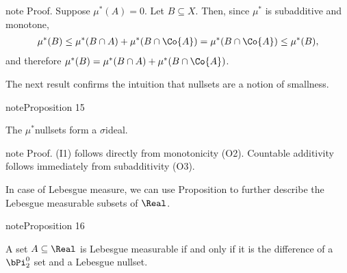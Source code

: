 \documentclass[letterpaper,10pt,english]{jupyterBook}
\begin{document}
\begin{sphinxadmonition}{note}
\sphinxAtStartPar
Proof. Suppose \(\mu^*(A)=0\). Let \(B \subseteq X\). Then, since \(\mu^*\) is subadditive and monotone,
\begin{equation*}
\begin{split}
    \mu^*(B) \leq \mu^*(B \cap A) + \mu^*(B \cap \Co{A}) = \mu^*(B \cap \Co{A}) \leq \mu^*(B),
\end{split}
\end{equation*}
\sphinxAtStartPar
and therefore \(\mu^*(B) = \mu^*(B \cap A) + \mu^*(B \cap \Co{A})\).
\end{sphinxadmonition}

\sphinxAtStartPar
The next result confirms the intuition that nullsets are a notion of smallness.
\label{measure:prop-null-sigmaideal}
\begin{sphinxadmonition}{note}{Proposition 15}



\sphinxAtStartPar
The \(\mu^*\)\sphinxhyphen{}nullsets form a \(\sigma\)\sphinxhyphen{}ideal.
\end{sphinxadmonition}

\begin{sphinxadmonition}{note}
\sphinxAtStartPar
Proof. (I1) follows directly from monotonicity (O2). Countable additivity follows immediately from subadditivity (O3).
\end{sphinxadmonition}

\sphinxAtStartPar
In case of Lebesgue measure, we can use Proposition {\hyperref[\detokenize{measure:prop-nullsets-measurable}]{}} to further describe the Lebesgue measurable subsets of \(\Real\).
\label{measure:measurable-diff-Borel}
\begin{sphinxadmonition}{note}{Proposition 16}



\sphinxAtStartPar
A set \(A \subseteq \Real\) is Lebesgue measurable if and only if it is the difference of a \(\bPi^0_2\) set and a Lebesgue nullset.
\end{sphinxadmonition}
\end{document}
